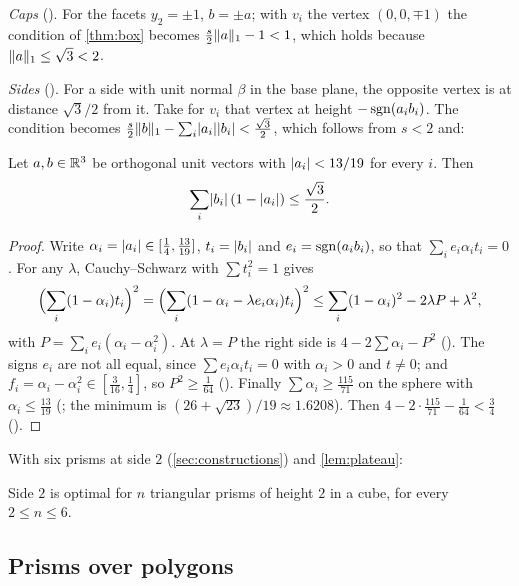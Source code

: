 \documentclass[11pt,a4paper]{article}
\begin{document}
\emph{Caps} (). For the facets $y_2=\pm1$, $b=\pm a$; with $v_i$ the vertex $(0,0,\mp1)$ the condition of \cref{thm:box} becomes $\tfrac s2\lVert a\rVert_1-1<1$, which holds because $\lVert a\rVert_1\le\sqrt3<2$.

\emph{Sides} (). For a side with unit normal $\beta$ in the base plane, the opposite vertex is at distance $\sqrt3/2$ from it. Take for $v_i$ that vertex at height $-\operatorname{sgn}(a_ib_i)$. The condition becomes $\tfrac s2\lVert b\rVert_1-\sum_i\lvert a_i\rvert\lvert b_i\rvert<\tfrac{\sqrt3}2$, which follows from $s<2$ and:

\begin{lemma}\label{lem:key3}
Let $a,b\in\mathbb R^3$ be orthogonal unit vectors with $\lvert a_i\rvert<13/19$ for every $i$. Then
\[
\sum_i\lvert b_i\rvert\,(1-\lvert a_i\rvert)\le\frac{\sqrt3}2.
\]
\end{lemma}
\begin{proof}
Write $\alpha_i=\lvert a_i\rvert\in[\tfrac14,\tfrac{13}{19}]$, $t_i=\lvert b_i\rvert$ and $e_i=\operatorname{sgn}(a_ib_i)$, so that $\sum_ie_i\alpha_it_i=0$. For any $\lambda$, Cauchy--Schwarz with $\sum t_i^2=1$ gives
\[
\Bigl(\sum_i(1-\alpha_i)t_i\Bigr)^2=\Bigl(\sum_i(1-\alpha_i-\lambda e_i\alpha_i)t_i\Bigr)^2\le\sum_i(1-\alpha_i)^2-2\lambda P+\lambda^2,
\]
with $P=\sum_ie_i(\alpha_i-\alpha_i^2)$. At $\lambda=P$ the right side is $4-2\sum\alpha_i-P^2$ (). The signs $e_i$ are not all equal, since $\sum e_i\alpha_it_i=0$ with $\alpha_i>0$ and $t\ne0$; and $f_i=\alpha_i-\alpha_i^2\in[\tfrac3{16},\tfrac14]$, so $P^2\ge\tfrac1{64}$ (). Finally $\sum\alpha_i\ge\tfrac{115}{71}$ on the sphere with $\alpha_i\le\tfrac{13}{19}$ (; the minimum is $(26+\sqrt{23})/19\approx1.6208$). Then $4-2\cdot\tfrac{115}{71}-\tfrac1{64}<\tfrac34$ ().
\end{proof}

With six prisms at side $2$ (\cref{sec:constructions}) and \cref{lem:plateau}:

\begin{theorem}
Side $2$ is optimal for $n$ triangular prisms of height $2$ in a cube, for every $2\le n\le6$.
\end{theorem}

\subsection{Prisms over polygons}\label{sec:poly}
\end{document}
